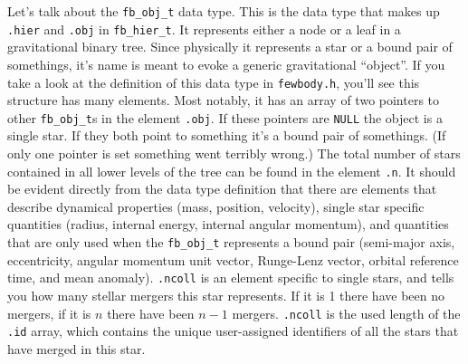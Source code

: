\documentclass[10pt,preprint]{aastex} %
\begin{document}
Let's talk about the {\tt fb\_obj\_t} data type.  This is the data type that makes up 
{\tt .hier} and {\tt .obj} in {\tt fb\_hier\_t}.  It represents either a node or a leaf in
a gravitational binary tree.  Since physically it represents a star or a bound pair of somethings,
it's name is meant to evoke a generic gravitational ``object''.  If you take a look
at the definition of this data type in {\tt fewbody.h}, you'll see this structure has 
many elements.  Most notably, it has an array of two pointers to other {\tt fb\_obj\_t}s 
in the element {\tt .obj}.  If these pointers are {\tt NULL} the object is a single star.
If they both point to something it's a bound pair of somethings.  (If only one pointer
is set something went terribly wrong.)  The total number of stars contained in all lower
levels of the tree can be found in the element {\tt .n}.  It should be evident directly
from the data type definition that there are elements that describe dynamical properties (mass,
position, velocity), single star specific quantities (radius, internal energy, internal
angular momentum), and quantities that are only used when the {\tt fb\_obj\_t} represents
a bound pair (semi-major axis, eccentricity, angular momentum unit vector, Runge-Lenz vector,
orbital reference time, and mean anomaly).  {\tt .ncoll} is an element specific to single stars,
and tells you how many stellar mergers this star represents.  If it is 1 there have been no 
mergers, if it is $n$ there have been $n-1$ mergers.  {\tt .ncoll} is the used length
of the {\tt .id} array, which contains the unique user-assigned identifiers of all
the stars that have merged in this star.

\end{document}
